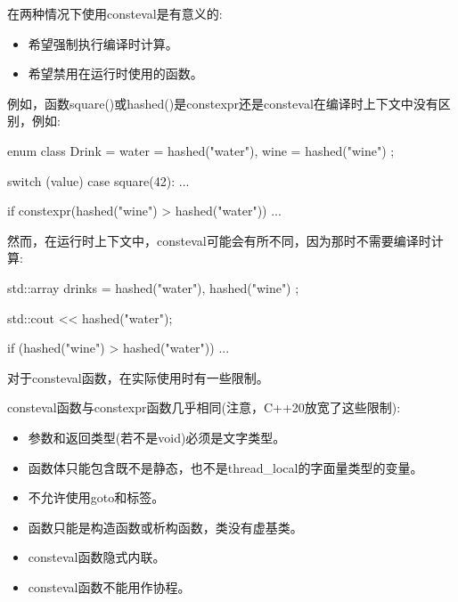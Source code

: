 在两种情况下使用consteval是有意义的:

\begin{itemize}
\item 
希望强制执行编译时计算。

\item 
希望禁用在运行时使用的函数。
\end{itemize}

例如，函数square()或hashed()是constexpr还是consteval在编译时上下文中没有区别，例如:

\begin{cpp}
enum class Drink = { water = hashed("water"), wine = hashed("wine") };

switch (value) {
	case square(42):
	...
}

if constexpr(hashed("wine") > hashed("water")) {
	...
}
\end{cpp}

然而，在运行时上下文中，consteval可能会有所不同，因为那时不需要编译时计算:

\begin{cpp}
std::array drinks = { hashed("water"), hashed("wine") };

std::cout << hashed("water");

if (hashed("wine") > hashed("water")) {
	...
}
\end{cpp}


对于consteval函数，在实际使用时有一些限制。


consteval函数与constexpr函数几乎相同(注意，C++20放宽了这些限制):

\begin{itemize}
\item 
参数和返回类型(若不是void)必须是文字类型。

\item 
函数体只能包含既不是静态，也不是thread\_local的字面量类型的变量。

\item 
不允许使用goto和标签。

\item 
函数只能是构造函数或析构函数，类没有虚基类。

\item 
consteval函数隐式内联。

\item 
consteval函数不能用作协程。
\end{itemize}


